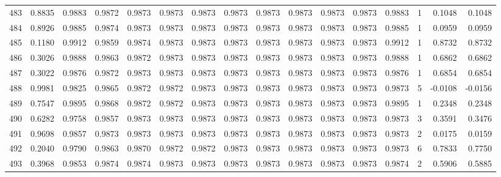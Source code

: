 \begin{tabular}{lrrrrrrrrrrrrrrr}
483 &      0.8835 &  0.9883 &  0.9872 &  0.9873 &  0.9873 &  0.9873 &  0.9873 &  0.9873 &  0.9873 &  0.9873 &   0.9873 &     0.9883 &      1 &                    0.1048 &                     0.1048 \\
484 &      0.8926 &  0.9885 &  0.9874 &  0.9873 &  0.9873 &  0.9873 &  0.9873 &  0.9873 &  0.9873 &  0.9873 &   0.9873 &     0.9885 &      1 &                    0.0959 &                     0.0959 \\
485 &      0.1180 &  0.9912 &  0.9859 &  0.9874 &  0.9873 &  0.9873 &  0.9873 &  0.9873 &  0.9873 &  0.9873 &   0.9873 &     0.9912 &      1 &                    0.8732 &                     0.8732 \\
486 &      0.3026 &  0.9888 &  0.9863 &  0.9872 &  0.9873 &  0.9873 &  0.9873 &  0.9873 &  0.9873 &  0.9873 &   0.9873 &     0.9888 &      1 &                    0.6862 &                     0.6862 \\
487 &      0.3022 &  0.9876 &  0.9872 &  0.9873 &  0.9873 &  0.9873 &  0.9873 &  0.9873 &  0.9873 &  0.9873 &   0.9873 &     0.9876 &      1 &                    0.6854 &                     0.6854 \\
488 &      0.9981 &  0.9825 &  0.9865 &  0.9872 &  0.9872 &  0.9873 &  0.9873 &  0.9873 &  0.9873 &  0.9873 &   0.9873 &     0.9873 &      5 &                   -0.0108 &                    -0.0156 \\
489 &      0.7547 &  0.9895 &  0.9868 &  0.9872 &  0.9872 &  0.9873 &  0.9873 &  0.9873 &  0.9873 &  0.9873 &   0.9873 &     0.9895 &      1 &                    0.2348 &                     0.2348 \\
490 &      0.6282 &  0.9758 &  0.9857 &  0.9873 &  0.9873 &  0.9873 &  0.9873 &  0.9873 &  0.9873 &  0.9873 &   0.9873 &     0.9873 &      3 &                    0.3591 &                     0.3476 \\
491 &      0.9698 &  0.9857 &  0.9873 &  0.9873 &  0.9873 &  0.9873 &  0.9873 &  0.9873 &  0.9873 &  0.9873 &   0.9873 &     0.9873 &      2 &                    0.0175 &                     0.0159 \\
492 &      0.2040 &  0.9790 &  0.9863 &  0.9870 &  0.9872 &  0.9872 &  0.9873 &  0.9873 &  0.9873 &  0.9873 &   0.9873 &     0.9873 &      6 &                    0.7833 &                     0.7750 \\
493 &      0.3968 &  0.9853 &  0.9874 &  0.9874 &  0.9873 &  0.9873 &  0.9873 &  0.9873 &  0.9873 &  0.9873 &   0.9873 &     0.9874 &      2 &                    0.5906 &                     0.5885 \\

\end{tabular}
